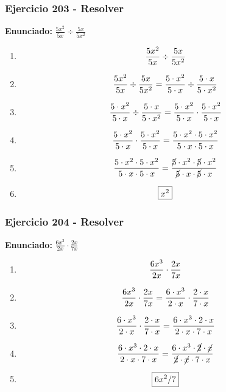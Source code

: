 \documentclass[11pt,a4paper]{article}
\newcommand{\fitmath}[1]{%
\[
\setbox0=\hbox{$\displaystyle #1$}%
\ifdim\wd0>\linewidth
\resizebox{\linewidth}{!}{$\displaystyle #1$}%
\else
#1%
\fi
\]
}
\begin{document}
\vspace{0.12cm}
\subsubsection*{Ejercicio 203 - Resolver}
\textbf{Enunciado:} $ \frac{5 x^{2}}{5 x} \div \frac{5 x}{5 x^{2}} $\par
\begin{enumerate}[leftmargin=2em]
\item \fitmath{\frac{5 x^{2}}{5 x} \div \frac{5 x}{5 x^{2}}}
\item \fitmath{\frac{5 x^{2}}{5 x} \div \frac{5 x}{5 x^{2}}= \frac{5\cdot x^{2}}{5\cdot x} \div \frac{5\cdot x}{5\cdot x^{2}}}
\item \fitmath{\frac{5\cdot x^{2}}{5\cdot x}\div \frac{5\cdot x}{5\cdot x^{2}}= \frac{5\cdot x^{2}}{5\cdot x}\cdot \frac{5\cdot x^{2}}{5\cdot x}}
\item \fitmath{\frac{5\cdot x^{2}}{5\cdot x}\cdot \frac{5\cdot x^{2}}{5\cdot x}= \frac{5\cdot x^{2}\cdot 5\cdot x^{2}}{5\cdot x\cdot 5\cdot x}}
\item \fitmath{\frac{5\cdot x^{2}\cdot 5\cdot x^{2}}{5\cdot x\cdot 5\cdot x}= \frac{\cancel{5}\cdot x^{2}\cdot \cancel{5}\cdot x^{2}}{\cancel{5}\cdot x\cdot \cancel{5}\cdot x}}
\item \fitmath{\boxed{x^{2}}}
\end{enumerate}

\vspace{0.12cm}
\subsubsection*{Ejercicio 204 - Resolver}
\textbf{Enunciado:} $ \frac{6 x^{3}}{2 x} \cdot \frac{2 x}{7 x} $\par
\begin{enumerate}[leftmargin=2em]
\item \fitmath{\frac{6 x^{3}}{2 x} \cdot \frac{2 x}{7 x}}
\item \fitmath{\frac{6 x^{3}}{2 x} \cdot \frac{2 x}{7 x}= \frac{6\cdot x^{3}}{2\cdot x} \cdot \frac{2\cdot x}{7\cdot x}}
\item \fitmath{\frac{6\cdot x^{3}}{2\cdot x}\cdot \frac{2\cdot x}{7\cdot x}= \frac{6\cdot x^{3}\cdot 2\cdot x}{2\cdot x\cdot 7\cdot x}}
\item \fitmath{\frac{6\cdot x^{3}\cdot 2\cdot x}{2\cdot x\cdot 7\cdot x}= \frac{6\cdot x^{3}\cdot \cancel{2}\cdot \cancel{x}}{\cancel{2}\cdot \cancel{x}\cdot 7\cdot x}}
\item \fitmath{\boxed{6 x^{2} / 7}}
\end{enumerate}
\end{document}
